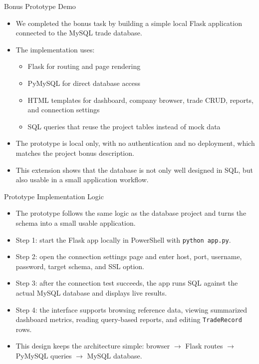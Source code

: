 \documentclass[aspectratio=169]{beamer}
\begin{document}
\begin{frame}{Bonus Prototype Demo}
\begin{itemize}
    \item We completed the bonus task by building a simple local Flask application connected to the MySQL trade database.
    \item The implementation uses:
    \begin{itemize}
        \item Flask for routing and page rendering
        \item PyMySQL for direct database access
        \item HTML templates for dashboard, company browser, trade CRUD, reports, and connection settings
        \item SQL queries that reuse the project tables instead of mock data
    \end{itemize}
    \item The prototype is local only, with no authentication and no deployment, which matches the project bonus description.
    \item This extension shows that the database is not only well designed in SQL, but also usable in a small application workflow.
\end{itemize}
\end{frame}

\begin{frame}{Prototype Implementation Logic}
\small
\begin{itemize}
    \item The prototype follows the same logic as the database project and turns the schema into a small usable application.
    \item Step 1: start the Flask app locally in PowerShell with \texttt{python app.py}.
    \item Step 2: open the connection settings page and enter host, port, username, password, target schema, and SSL option.
    \item Step 3: after the connection test succeeds, the app runs SQL against the actual MySQL database and displays live results.
    \item Step 4: the interface supports browsing reference data, viewing summarized dashboard metrics, reading query-based reports, and editing \texttt{TradeRecord} rows.
    \item This design keeps the architecture simple: browser $\rightarrow$ Flask routes $\rightarrow$ PyMySQL queries $\rightarrow$ MySQL database.
\end{itemize}
\end{frame}
\end{document}
